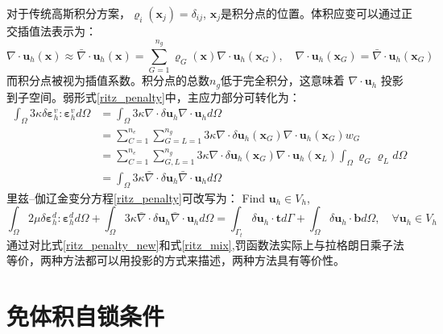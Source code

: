 对于传统高斯积分方案，$\varrho_i(\boldsymbol x_j) = \delta_{ij}$, $\boldsymbol x_j$是积分点的位置。体积应变可以通过正交插值法表示为：
\begin{equation}
    \nabla \cdot \boldsymbol u_h(\boldsymbol x) \approx \bar \nabla \cdot \boldsymbol u_h(\boldsymbol x) = \sum_{G=1}^{n_g} \varrho_G(\boldsymbol x) \nabla \cdot \boldsymbol u_h(\boldsymbol x_G), \quad \nabla \cdot \boldsymbol u_h(\boldsymbol x_G) = \bar \nabla \cdot \boldsymbol u_h(\boldsymbol x_G)
\end{equation}
而积分点被视为插值系数。积分点的总数$n_g$低于完全积分，这意味着 $\nabla \cdot \boldsymbol u_h$ 投影到子空间。弱形式\eqref{ritz_penalty}中，主应力部分可转化为：
\begin{equation}\label{projection_penalty}
    \begin{split}
        \int_\Omega 3\kappa \delta \boldsymbol \varepsilon^v_h : \boldsymbol \varepsilon^v_h d\Omega &=\int_\Omega 3\kappa \nabla \cdot \delta \boldsymbol u_h \nabla \cdot \boldsymbol u_h d\Omega  \\
        &= \sum_{C=1}^{n_e} \sum_{G=L=1}^{n_g} 3\kappa \nabla \cdot \delta \boldsymbol u_h(\boldsymbol x_G) \nabla \cdot \boldsymbol u_h(\boldsymbol x_G) w_G \\
        &= \sum_{C=1}^{n_e} \sum_{G,L=1}^{n_g} 3\kappa \nabla \cdot \delta \boldsymbol u_h(\boldsymbol x_G) \nabla \cdot \boldsymbol u_h(\boldsymbol x_L) \int_\Omega \varrho_G \varrho_L d\Omega  \\
        &=\int_\Omega 3\kappa \bar\nabla \cdot \delta \boldsymbol u_h \bar\nabla \cdot \boldsymbol u_h d\Omega
    \end{split}
\end{equation}
里兹--伽辽金变分方程\eqref{ritz_penalty}可改写为：
Find $\boldsymbol u_h \in V_h$,
\begin{equation}\label{ritz_penalty_new}
    \int_\Omega 2\mu \delta \boldsymbol \varepsilon^d_h : \boldsymbol \varepsilon^d_h d\Omega +
    \int_\Omega 3\kappa \bar \nabla \cdot \delta \boldsymbol u_h \bar \nabla \cdot \boldsymbol u_h d\Omega =
    \int_{\Gamma_t} \delta \boldsymbol u_h \cdot \boldsymbol t d\Gamma + \int_\Omega \delta \boldsymbol u_h \cdot \boldsymbol b d\Omega, \quad \forall \boldsymbol u_h \in V_h
\end{equation}
通过对比式\eqref{ritz_penalty_new}和式\eqref{ritz_mix},罚函数法实际上与拉格朗日乘子法等价，两种方法都可以用投影的方式来描述，两种方法具有等价性。

\section{免体积自锁条件}
